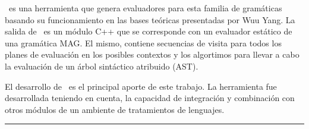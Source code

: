 \documentclass[a4paper,12pt,twoside]{ThesisStyle}
\begin{document}
\begin{vcenterpage}
\maggen\ es una herramienta que genera evaluadores para esta familia de gramáticas basando su funcionamiento en las bases teóricas presentadas por Wuu Yang. La salida de \maggen\ es un módulo C++ que se corresponde con un evaluador estático de una gramática MAG. El mismo, contiene secuencias de visita para todos los planes de evaluación en los posibles contextos y los algortimos para llevar a cabo la evaluación de un árbol sintáctico atribuido (AST).

El desarrollo de \maggen\ es el principal aporte de este trabajo. La herramienta fue desarrollada teniendo en cuenta, la capacidad de integración y combinación con otros módulos de un ambiente de tratamientos de lenguajes.

% 

\noindent\rule[2pt]{\textwidth}{0.5pt}

\end{vcenterpage}

\tableofcontents

\mainmatter

% 
\appendix



\listoffigures

\listoftables

\listofalgorithms


% 
% 



\end{document}
